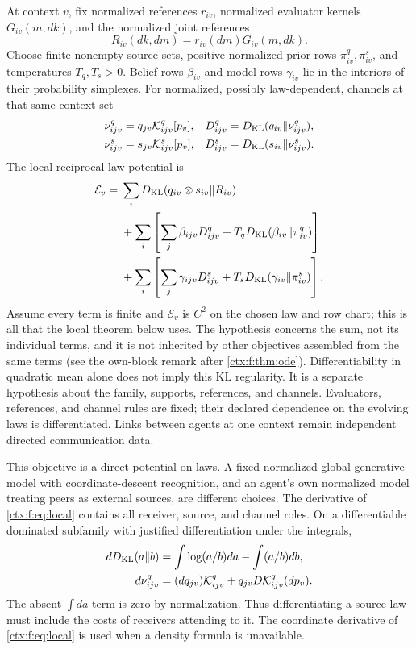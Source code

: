 At context $v$, fix normalized references $r_{iv}$, normalized evaluator kernels $G_{iv}(m,dk)$, and the normalized joint references
\begin{equation}
 R_{iv}(dk,dm)=r_{iv}(dm)G_{iv}(m,dk).
\end{equation}
Choose finite nonempty source sets, positive normalized prior rows $\pi^q_{iv},\pi^s_{iv}$, and temperatures $T_q,T_s>0$. Belief rows $\beta_{iv}$ and model rows $\gamma_{iv}$ lie in the interiors of their probability simplexes. For normalized, possibly law-dependent, channels at that same context set
\begin{align}
 \nu^q_{ijv}&=q_{jv}\mathcal K^q_{ijv}[p_v],&
 D^q_{ijv}&=D_{\mathrm{KL}}(q_{iv}\Vert\nu^q_{ijv}),\\
 \nu^s_{ijv}&=s_{jv}\mathcal K^s_{ijv}[p_v],&
 D^s_{ijv}&=D_{\mathrm{KL}}(s_{iv}\Vert\nu^s_{ijv}).
\end{align}
The local reciprocal law potential is
\begin{align}
 \mathcal E_v={}&\sum_iD_{\mathrm{KL}}(q_{iv}\otimes s_{iv}\Vert R_{iv})\nonumber\\
 &+\sum_i\left[\sum_j\beta_{ijv}D^q_{ijv}
                   +T_qD_{\mathrm{KL}}(\beta_{iv}\Vert\pi^q_{iv})\right]\nonumber\\
 &+\sum_i\left[\sum_j\gamma_{ijv}D^s_{ijv}
                   +T_sD_{\mathrm{KL}}(\gamma_{iv}\Vert\pi^s_{iv})\right].
 \label{ctx:f:eq:local}
\end{align}
Assume every term is finite and $\mathcal E_v$ is $C^2$ on the chosen law and row chart; this is all that the local theorem below uses. The hypothesis concerns the sum, not its individual terms, and it is not inherited by other objectives assembled from the same terms (see the own-block remark after \cref{ctx:f:thm:ode}). Differentiability in quadratic mean alone does not imply this KL regularity. It is a separate hypothesis about the family, supports, references, and channels. Evaluators, references, and channel rules are fixed; their declared dependence on the evolving laws is differentiated. Links between agents at one context remain independent directed communication data.

This objective is a direct potential on laws. A fixed normalized global generative model with coordinate-descent recognition, and an agent's own normalized model treating peers as external sources, are different choices. The derivative of \cref{ctx:f:eq:local} contains all receiver, source, and channel roles. On a differentiable dominated subfamily with justified differentiation under the integrals,
\begin{align}
 dD_{\mathrm{KL}}(a\Vert b)&=\int\log(a/b)da-\int(a/b)db,\\
 d\nu^q_{ijv}&=(dq_{jv})\mathcal K^q_{ijv}
                 +q_{jv}D\mathcal K^q_{ijv}(dp_v).
 \label{ctx:f:eq:roles}
\end{align}
The absent $\int da$ term is zero by normalization. Thus differentiating a source law must include the costs of receivers attending to it. The coordinate derivative of \cref{ctx:f:eq:local} is used when a density formula is unavailable.

